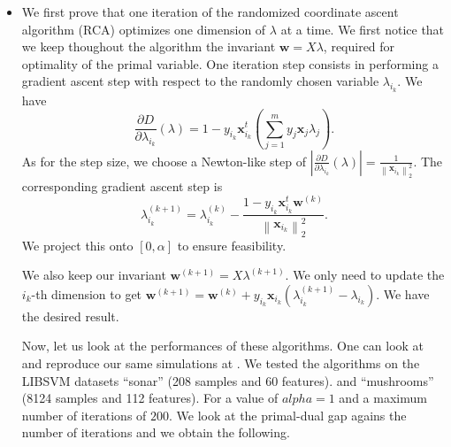\documentclass{article}
\begin{document}
\begin{itemize}
       \item We first prove that one iteration
           of the randomized coordinate ascent
           algorithm (RCA) optimizes one
           dimension of $\lambda$ at a time.
           We first notice that we keep
           thoughout the algorithm the
           invariant $\mathbf{w} = X \lambda$,
           required for optimality of the primal variable.
           One iteration step
           consists in performing
           a gradient ascent step
           with respect to the randomly
           chosen variable $\lambda_{i_{k}}$.
           We have
           \begin{equation*}
               \frac{\partial D}{\partial \lambda_{i_{k}}} \left(\lambda\right) = 
               1 - y_{i_{k}} \mathbf{x}_{i_{k}}^{t}
               \left(\sum_{j = 1}^{m}y_{j}\mathbf{x}_{j} \lambda_{j}\right).
           \end{equation*}
           As for the step size, we choose a Newton-like
           step of $\left|\frac{\partial D}{\partial \lambda_{i_{k}}}\left(\lambda\right)\right|
           = \frac{1}{\left\|\mathbf{x}_{i_{k}}\right\|_{2}^{2}}$.
           The corresponding gradient ascent step is
           \begin{equation*}
              \lambda^{\left(k+1\right)}_{i_{k}} = 
              \lambda_{i_{k}}^{\left(k\right)} -
              \frac{1 - y_{i_{k}}\mathbf{x}_{i_{k}}^{t}\mathbf{w}^{\left(k\right)}}{\left\|\mathbf{x}_{i_{k}}\right\|^{2}_{2}}.
           \end{equation*}
           We project this onto $\left[0, \alpha\right]$ to ensure
           feasibility.

           We also keep our invariant $\mathbf{w}^{\left(k+1\right)} = X \lambda^{\left(k+1\right)}$.
           We only need to update the $i_{k}$-th dimension to get
           $\mathbf{w}^{\left(k + 1\right)} = \mathbf{w}^{\left(k\right)}
           + y_{i_{k}}\mathbf{x}_{i_{k}} \left(\lambda_{i_{k}}^{\left(k+1\right)} - \lambda_{i_{k}}\right)$.
           We have the desired result.
 
           Now, let us look at the performances of 
           these algorithms. One can look
           at and reproduce our same simulations
           at .
           We tested the algorithms on the
           LIBSVM datasets ``sonar'' (208 samples 
           and 60 features).
           and ``mushrooms'' (8124 samples and
           112 features).
           For a value of $alpha = 1$
           and a maximum number of iterations
           of $200$. We look at the primal-dual
           gap agains the number of
           iterations and we obtain the following.


\end{itemize}
\end{document}
